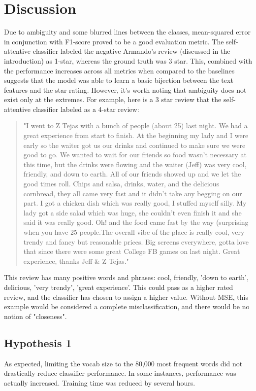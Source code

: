 \section{Discussion}
Due to ambiguity and some blurred lines between the classes, mean-squared error in conjunction with F1-score proved to be a good evaluation metric. The self-attentive classifier labeled the negative Armando's review (discussed in the introduction) as 1-star, whereas the ground truth was 3 star. This, combined with the performance increases across all metrics when compared to the baselines suggests that the model was able to learn a basic bijection between the text features and the star rating. However, it's worth noting that ambiguity does not exist only at the extremes. For example, here is a 3 star review that the self-attentive classifier labeled as a 4-star review:
\begin{quote}
	"I went to Z Tejas with a bunch of people (about 25) last night.  We had a great experience from start to finish.  At the beginning my lady and I were early so the waiter got us our drinks and continued to make sure we were good to go.  We wanted to wait for our friends so food wasn't necessary at this time, but the drinks were flowing and the waiter (Jeff) was very cool, friendly, and down to earth.  All of our friends showed up and we let the good times roll.  Chips and salsa, drinks, water, and the delicious cornbread, they all came very fast and it didn't take any begging on our part.  I got a chicken dish which was really good, I stuffed myself silly.  My lady got a side salad which was huge, she couldn't even finish it and she said it was really good.  Oh! and the food came fast by the way (surprising when you have 25 people.The overall vibe of the place is really cool, very trendy and fancy but reasonable prices.  Big screens everywhere, gotta love that since there were some great College FB games on last night.  Great experience, thanks Jeff \& Z Tejas."
\end{quote}
This review has many positive words and phrases: cool, friendly, 'down to earth', delicious, 'very trendy', 'great experience'. This could pass as a higher rated review, and the classifier has chosen to assign a higher value. Without MSE, this example would be considered a complete misclassification, and there would be no notion of "closeness".
 
\subsection{Hypothesis 1}
As expected, limiting the vocab size to the 80,000 most frequent words did not drastically reduce classifier performance. In some instances, performance was actually increased. Training time was reduced by several hours. 

